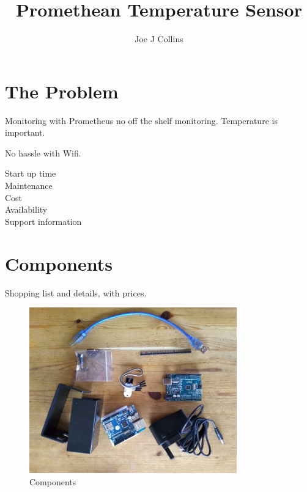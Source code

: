 \documentclass[a4paper, 12pt]{article}
\title{Promethean Temperature Sensor}
\author{Joe J Collins}
\begin{document}
\maketitle
\tableofcontents


\section{The Problem}

Monitoring with Prometheus
no off the shelf monitoring.
Temperature is important.

No hassle with Wifi.

\begin{description}
  \item[Start up time]
  \item[Maintenance]
  \item[Cost]
  \item[Availability]
  \item[Support information] 
\end{description}


\section{Components}

Shopping list and details, with prices.

\begin{figure}[H]
  \centering
  \includegraphics[width=0.8\textwidth]{components.jpg}
  \caption{Components}
\end{figure}
\end{document}
